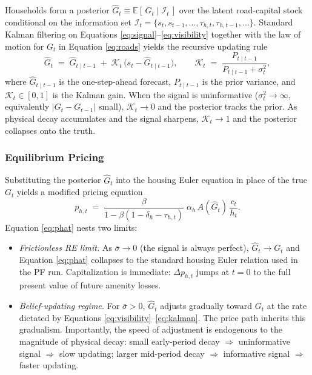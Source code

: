 Households form a posterior $\hat{G}_t \equiv \mathbb{E}[\,G_t \mid \mathcal{I}_t\,]$ over the latent road-capital stock conditional on the information set $\mathcal{I}_t = \{s_t, s_{t-1}, \dots, \tau_{h,t}, \tau_{h,t-1}, \dots\}$. Standard Kalman filtering on Equations \ref{eq:signal}--\ref{eq:visibility} together with the law of motion for $G_t$ in Equation \ref{eq:roads} yields the recursive updating rule
\begin{equation}
\hat{G}_{t} \;=\; \hat{G}_{t \mid t-1} \;+\; \mathcal{K}_t \,\big(s_t - \hat{G}_{t \mid t-1}\big),
\qquad
\mathcal{K}_t \;=\; \frac{P_{t \mid t-1}}{P_{t \mid t-1} + \sigma_t^2},
\label{eq:kalman}
\end{equation}
where $\hat{G}_{t \mid t-1}$ is the one-step-ahead forecast, $P_{t \mid t-1}$ is the prior variance, and $\mathcal{K}_t \in [0,1]$ is the Kalman gain. When the signal is uninformative ($\sigma_t^2 \to \infty$, equivalently $|G_t - G_{t-1}|$ small), $\mathcal{K}_t \to 0$ and the posterior tracks the prior. As physical decay accumulates and the signal sharpens, $\mathcal{K}_t \to 1$ and the posterior collapses onto the truth.

\subsubsection{Equilibrium Pricing}

Substituting the posterior $\hat{G}_t$ into the housing Euler equation in place of the true $G_t$ yields a modified pricing equation
\begin{equation}
p_{h,t} \;=\; \frac{\beta}{1 - \beta(1-\delta_h - \tau_{h,t})}\;\alpha_h\, A(\hat{G}_t)\, \frac{c_t}{h_t}.
\label{eq:phat}
\end{equation}
Equation \ref{eq:phat} nests two limits:

\begin{itemize}
\item {\it Frictionless RE limit.} As $\bar{\sigma} \to 0$ (the signal is always perfect), $\hat{G}_t \to G_t$ and Equation \ref{eq:phat} collapses to the standard housing Euler relation used in the PF run. Capitalization is immediate: $\Delta p_{h,t}$ jumps at $t=0$ to the full present value of future amenity losses.

\item {\it Belief-updating regime.} For $\bar{\sigma} > 0$, $\hat{G}_t$ adjusts gradually toward $G_t$ at the rate dictated by Equations \ref{eq:visibility}--\ref{eq:kalman}. The price path inherits this gradualism. Importantly, the speed of adjustment is endogenous to the magnitude of physical decay: small early-period decay $\Rightarrow$ uninformative signal $\Rightarrow$ slow updating; larger mid-period decay $\Rightarrow$ informative signal $\Rightarrow$ faster updating.
\end{itemize}

